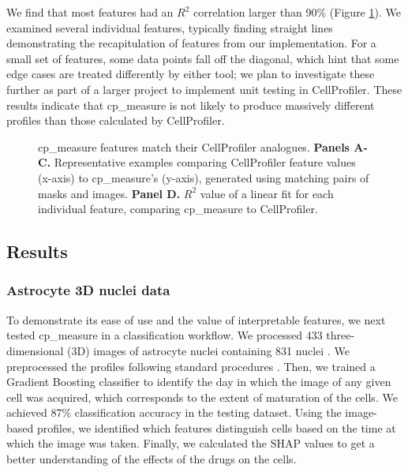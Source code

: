 \documentclass{article}
\begin{document}
We find that most features had an $R^2$ correlation larger than 90\% (Figure \ref{fig:cp_vs_cpmeasure}). We examined several individual features, typically finding straight lines demonstrating the recapitulation of features from our implementation. For a small set of features, some data points fall off the diagonal, which hint that some edge cases are treated differently by either tool; we plan to investigate these further as part of a larger project to implement unit testing in CellProfiler. These results indicate that cp\_measure is not likely to produce massively different profiles than those calculated by CellProfiler.

\begin{figure}[htbp]
\centering

\caption{\label{fig:cp_vs_cpmeasure}cp\_measure features match their CellProfiler analogues. \textbf{Panels A-C.} Representative examples comparing CellProfiler feature values (x-axis) to cp\_measure's (y-axis), generated using matching pairs of masks and images. \textbf{Panel D.} \(R^2\) value of a linear fit for each individual feature, comparing cp\_measure to CellProfiler.}
\end{figure}

\subsection{Results}
\label{sec:orge5b5c6b}
\subsubsection{Astrocyte 3D nuclei data}
\label{sec:org447090b}

To demonstrate its ease of use and the value of interpretable features, we next tested cp\_measure in a classification workflow. We processed 433 three-dimensional (3D) images of astrocyte nuclei containing 831 nuclei \citep{kalinin3DCellNuclear2018}. We preprocessed the profiles following standard procedures \citep{caicedoDataanalysisStrategiesImagebased2017}. Then, we trained a Gradient Boosting classifier to identify the day in which the image of any given cell was acquired, which corresponds to the extent of maturation of the cells. We achieved 87\% classification accuracy in the testing dataset. Using the image-based profiles, we identified which features distinguish cells based on the time at which the image was taken. Finally, we calculated the SHAP values \citep{sundararajanManyShapleyValues2020} to get a better understanding of the effects of the drugs on the cells.
\end{document}
